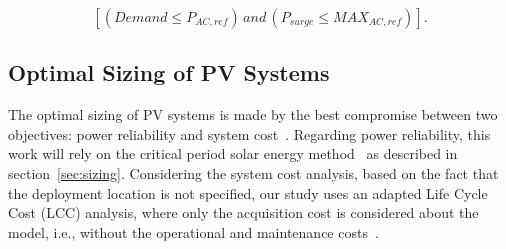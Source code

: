 \documentclass[review]{elsarticle}
\begin{document}
\begin{equation}
\label{eq:invcheck} 
\left[ (Demand \leq P_{AC,ref}) \, and \, (P_{surge} \leq MAX_{AC,ref}) \right].
\end{equation}

\subsection{Optimal Sizing of PV Systems}
%
The optimal sizing of PV systems is made by the best compromise between two objectives: power reliability and system cost~\cite{Alsadi2018}. 
Regarding power reliability, this work will rely on the critical period solar energy method~\cite{Pinho} as described in section~\ref{sec:sizing}. 
Considering the system cost analysis, based on the fact that the deployment location is not specified, our study uses an adapted Life Cycle Cost (LCC) analysis, where only the acquisition cost is considered about the model, i.e., without the operational and maintenance costs~\cite{Alsadi2018}.
\end{document}
